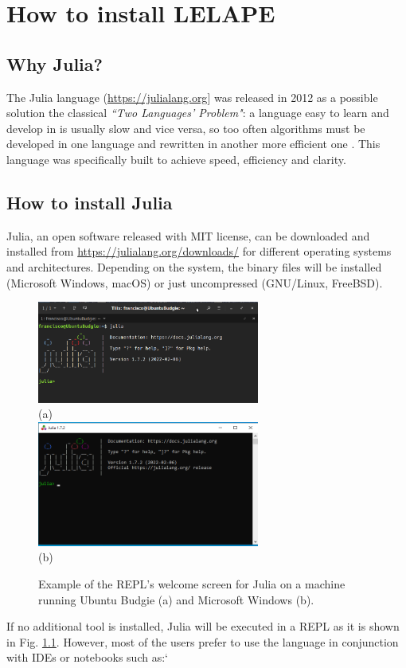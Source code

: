 \chapter{How to install LELAPE}
\section{Why Julia?}
The Julia language (\href{https://julialang.org}{https://julialang.org}] was released in 2012 as a possible solution the classical \textit{``Two Languages' Problem"}: a language easy to learn and develop in is usually slow and vice versa, so too often algorithms must be developed in one language and rewritten in another more efficient one \cite{bezanson2017julia}. This language was specifically built to achieve speed, efficiency and clarity.

\section{How to install Julia}
%
Julia, an open software released with MIT license, can be downloaded and installed from \href{https://julialang.org/downloads/}{https://julialang.org/downloads/} for different operating systems and architectures. Depending on the system, the binary files will be installed (Microsoft Windows, macOS) or just uncompressed (GNU/Linux, FreeBSD). 

\begin{figure}
	\centering
	\includegraphics[width=0.65\textwidth]{fig/Julia_REPL} 
	\\(a)\\
	\vspace{1cm}
	\includegraphics[width=0.65\textwidth]{fig/julia_in_windows}
	\\(b)\\
	\caption{Example of the REPL's welcome screen for Julia on a machine running Ubuntu Budgie (a) and Microsoft Windows (b).}
	\label{Fig;JuliaREPL}
\end{figure}
%
If no additional tool is installed, Julia will be executed in a REPL as it is shown in Fig. \ref{Fig;JuliaREPL}. However, most of the users prefer to use the language in conjunction with IDEs or notebooks such as:`

